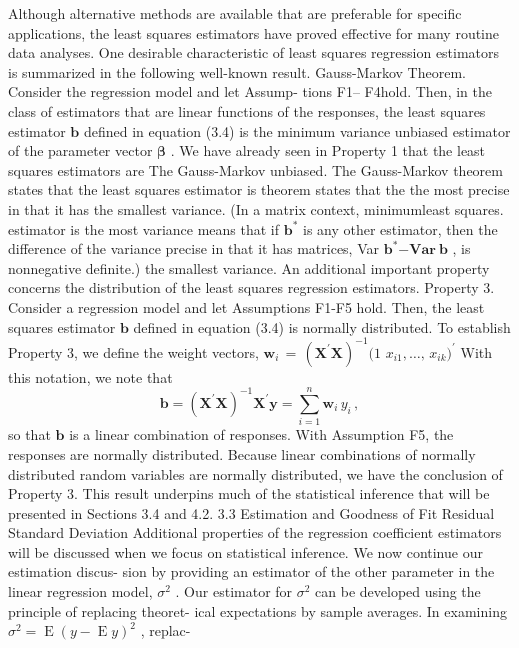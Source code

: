 \documentclass[11pt]{article}
\begin{document}
Although alternative methods are available that are preferable for specific
 applications, the least squares estimators have proved effective for many routine
 data analyses. One desirable characteristic of least squares regression estimators
 is summarized in the following well-known result.
Gauss-Markov Theorem. Consider the regression model and let Assump-
 tions F1-- F4hold. Then, in the class of estimators that are linear functions of
the responses, the least squares estimator \(\mathbf{b}\) defined in equation (3.4) is the
 minimum variance unbiased estimator of the parameter vector \(\boldsymbol{\beta}\) .
We have already seen in Property 1 that the least squares estimators are The Gauss-Markov
unbiased. The Gauss-Markov theorem states that the least squares estimator is theorem states that the
 the most precise in that it has the smallest variance. (In a matrix context, minimumleast squares.
estimator is the most
 variance means that if \(\mathbf{b^{*}}\) is any other estimator, then the difference of the variance precise in that it has
matrices, Var \(\mathbf{b^{*} \mathrm{-} V a r} ~ \mathbf{b}\) , is nonnegative definite.) the smallest variance.
An additional important property concerns the distribution of the least squares
regression estimators.
Property 3. Consider a regression model and let Assumptions F1-F5 hold.
Then, the least squares estimator \(\mathbf{b}\) defined in equation (3.4) is normally
distributed.
To establish Property 3, we define the weight vectors, \(\mathbf{w}_{i} \,=\, {( \mathbf{X}^{\prime} \mathbf{X} )}^{-1} ( 1\)
\(x_{i 1} , \dots, \, x_{i k} )^{\prime}\) With this notation, we note that 
\[
\mathbf{b=} \mathbf{( X^{\prime} X )}^{-1} \mathbf{X}^{\prime} \mathbf{y}=\sum_{i=1}^{n} \mathbf{w}_{i} \, y_{i} \, ,
\]
 so that \(\mathbf{b}\) is a linear combination of responses. With Assumption F5, the responses
 are normally distributed. Because linear combinations of normally distributed
random variables are normally distributed, we have the conclusion of Property 3.
This result underpins much of the statistical inference that will be presented in
Sections 3.4 and 4.2.
3.3 Estimation and Goodness of Fit
 Residual Standard Deviation
Additional properties of the regression coefficient estimators will be discussed
when we focus on statistical inference. We now continue our estimation discus-
 sion by providing an estimator of the other parameter in the linear regression
 model, \(\sigma^{2}\) .
 Our estimator for \(\sigma^{2}\) can be developed using the principle of replacing theoret-
 ical expectations by sample averages. In examining \(\sigma^{2}=\operatorname{E} \left( y-\operatorname{E} y \right)^{2}\) , replac-
\end{document}
